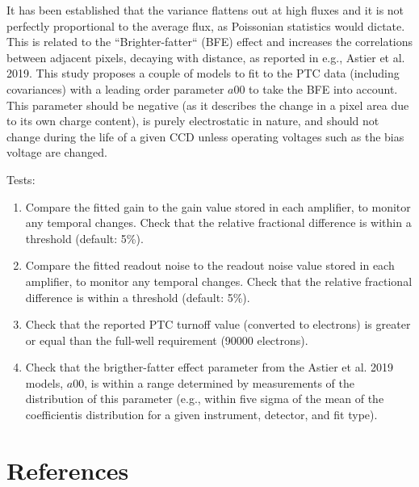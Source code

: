 \documentclass[DM,authoryear,toc,lsstdraft]{lsstdoc}
\begin{document}
It has been established that the variance flattens out at high fluxes and it is not perfectly proportional to the average flux, as Poissonian statistics would dictate. This is related to the ``Brighter-fatter`` (BFE) effect and increases the correlations between adjacent pixels, decaying with distance, as reported in e.g., Astier et al. 2019. This study proposes a couple of models to fit to the PTC data (including covariances) with a leading order parameter $a00$ to take the BFE into account. This parameter should be negative (as it describes the change in a pixel area due to its own charge content), is purely electrostatic in nature, and should not change during the life of a given CCD unless operating voltages such as the bias voltage are changed.  

Tests: 
\begin{enumerate}
\item Compare the fitted gain to the gain value stored in each amplifier, to monitor any temporal changes. Check that the relative fractional difference is within a threshold (default: 5\%).
\item Compare the fitted readout noise to the readout noise value stored in each amplifier, to monitor any temporal changes. Check that the relative fractional difference is within a threshold (default: 5\%).
\item Check that the reported PTC turnoff value (converted to electrons) is greater or equal than the full-well requirement (90000 electrons).
\item Check that the brigther-fatter effect parameter from the Astier et al. 2019 models, $a00$, is within a range determined by measurements of the distribution of this parameter (e.g., within five sigma of the mean of the coefficientis distribution for a given instrument, detector, and fit type).  
\end{enumerate}

\appendix

\section{References}
\label{sec:bib}

\end{document}

